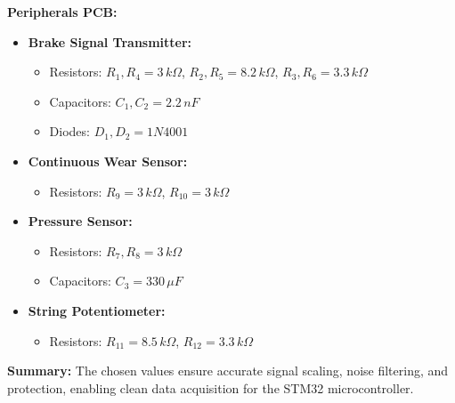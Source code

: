 \documentclass[12pt]{article}
\begin{document}
\textbf{Peripherals PCB:}
\begin{itemize}
    \item \textbf{Brake Signal Transmitter:}
    \begin{itemize}
        \item Resistors: \( R_1, R_4 = 3 \, k\Omega \), \( R_2, R_5 = 8.2 \, k\Omega \), \( R_3, R_6 = 3.3 \, k\Omega \)
        \item Capacitors: \( C_1, C_2 = 2.2 \, nF \)
        \item Diodes: \( D_1, D_2 = 1N4001 \)
    \end{itemize}
    \item \textbf{Continuous Wear Sensor:}
    \begin{itemize}
        \item Resistors: \( R_9 = 3 \, k\Omega \), \( R_{10} = 3 \, k\Omega \)
    \end{itemize}
    \item \textbf{Pressure Sensor:}
    \begin{itemize}
        \item Resistors: \( R_7, R_8 = 3 \, k\Omega \)
        \item Capacitors: \( C_3 = 330 \, \mu F \)
    \end{itemize}
    \item \textbf{String Potentiometer:}
    \begin{itemize}
        \item Resistors: \( R_{11} = 8.5 \, k\Omega \), \( R_{12} = 3.3 \, k\Omega \)
    \end{itemize}
\end{itemize}
\textbf{Summary:}
The chosen values ensure accurate signal scaling, noise filtering, and protection, enabling clean data acquisition for the STM32 microcontroller.
\end{document}
